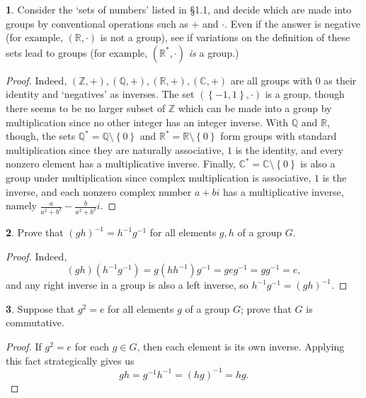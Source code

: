 \documentclass{article}
\theoremstyle{definition}
\newtheorem{ex}{}[section]
\begin{document}
\begin{ex}
	Consider the `sets of numbers' listed in \S 1.1, and decide which are made into groups by conventional operations such as $+$ and $\cdot$.
	Even if the answer is negative (for example, $(\mathbb{R}, \cdot)$ is not a group), see if variations on the definition of these sets lead to groups (for example, $(\mathbb{R}^*, \cdot)$ \textit{is} a group.)
\end{ex}
\begin{proof}
	Indeed, $(\mathbb{Z}, +), (\mathbb{Q}, +), (\mathbb{R}, +), (\mathbb{C}, +)$ are all groups with $0$ as their identity and `negatives' as inverses.
	The set $(\left\lbrace -1, 1 \right\rbrace, \cdot)$ is a group, though there seems to be no larger subset of $\mathbb{Z}$ which can be made into a group by multiplication since no other integer has an integer inverse.
	With $\mathbb{Q}$ and $\mathbb{R}$, though, the sets $\mathbb{Q}^* = \mathbb{Q} \setminus \left\lbrace 0 \right\rbrace$ and $\mathbb{R}^* = \mathbb{R} \setminus \left\lbrace 0 \right\rbrace$ form groups with standard multiplication since they are naturally associative, $1$ is the identity, and every nonzero element has a multiplicative inverse.
	Finally, $\mathbb{C}^* = \mathbb{C} \setminus \left\lbrace 0 \right\rbrace$ is also a group under multiplication since complex multiplication is associative, $1$ is the inverse, and each nonzero complex number $a + bi$ has a multiplicative inverse, namely $\frac{a}{a^2 + b^2} - \frac{b}{a^2 + b^2}i$.
\end{proof}

\begin{ex}
	Prove that $(gh)^{-1} = h^{-1}g^{-1}$ for all elements $g, h$ of a group $G$.
\end{ex}
\begin{proof}
	Indeed, \begin{equation*}
		(gh)(h^{-1}g^{-1}) = g(hh^{-1})g^{-1} = geg^{-1} = gg^{-1} = e,
	\end{equation*}
	and any right inverse in a group is also a left inverse, so $h^{-1}g^{-1} = (gh)^{-1}$.
\end{proof}

\begin{ex}
	Suppose that $g^2 = e$ for all elements $g$ of a group $G$; prove that $G$ is commutative.
\end{ex}
\begin{proof}
	If $g^2 = e$ for each $g \in G$, then each element is its own inverse.
	Applying this fact strategically gives us \begin{equation*}
		gh = g^{-1}h^{-1} = (hg)^{-1} = hg.
	\end{equation*}
\end{proof}
\end{document}
